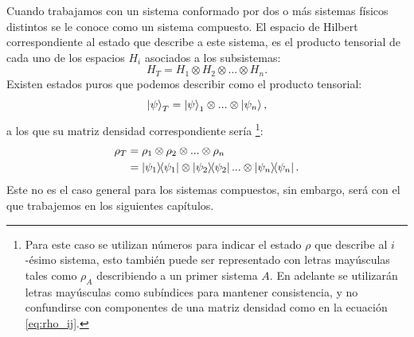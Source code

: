 \documentclass[letterpaper,12pt]{thesisECFM}
\theoremstyle{plain}
\theoremstyle{definition}
\theoremstyle{definition}
\theoremstyle{remark}
\newcommand{\1}{\mathbb{1}}
\begin{document}
Cuando trabajamos con un sistema conformado por dos o más sistemas físicos
distintos se le conoce como un sistema compuesto.  El espacio de Hilbert
correspondiente al estado que describe a este sistema, es el producto
tensorial de cada uno de los espacios $H_i$ asociados a los subsistemas: 
\begin{equation}
H_T=H_1 \otimes H_2\otimes...\otimes H_n.
\end{equation}
 Existen estados puros que podemos describir como el producto tensorial: 
\begin{equation}
    \ket{\psi}_T = \ket{\psi}_1 \otimes... \otimes \ket{\psi_n},
\end{equation}
a los que su matriz densidad correspondiente sería \cite{nielsen_chuang_2011}
\footnote{Para este caso se utilizan números para indicar el estado $\rho$ que
describe al $i$-ésimo sistema, esto también puede ser representado con letras
mayúsculas tales como $\rho_A$ describiendo a un primer sistema $A$. En
adelante se utilizarán letras mayúsculas como subíndices para mantener
consistencia, y no confundirse con componentes de una matriz densidad como en
la ecuación \ref{eq:rho_ij}.}: 
\begin{align}
    \rho_T  & = \rho_1 \otimes \rho_2 \otimes ... \otimes \rho_n \\
            & = \ketbra{\psi_1} \otimes \ketbra{\psi_2}... \otimes \ketbra{\psi_n}. 
\end{align}
Este no es el caso general para los sistemas compuestos, sin embargo, será con
el que trabajemos en los siguientes capítulos.
\end{document}
